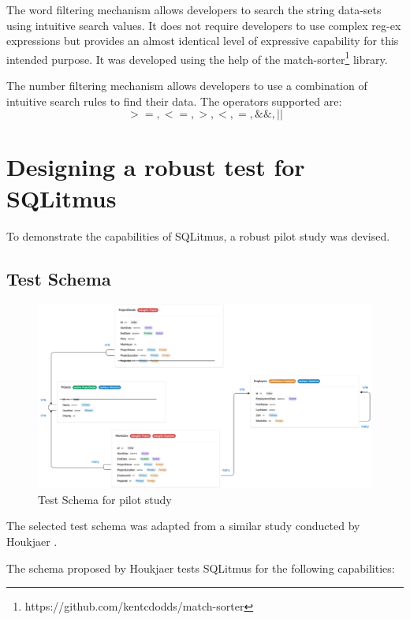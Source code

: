 \documentclass[12pt]{article}
\begin{document}
\begin{spacing}{1.9}
	The word filtering mechanism allows developers to search the string data-sets using intuitive search values. It does not require developers to use complex reg-ex expressions but provides an almost identical level of expressive capability for this intended purpose. It was developed using the help of the match-sorter\footnote{https://github.com/kentcdodds/match-sorter} library.
	
	The number filtering mechanism allows developers to use a combination of intuitive search rules to find their data. The operators supported are:
	\[>=, <=, >, <, =, \&\&, ||\]
	
	\pagebreak
	\section{ Designing a robust test for SQLitmus }
	
	To demonstrate the capabilities of SQLitmus, a robust pilot study was devised.
	
	\subsection{ Test Schema}
	
	\begin{figure}[H]
		\centering
		\includegraphics[width=\textwidth]{4-1.png}
		\caption{Test Schema for pilot study }
		
	\end{figure}
	
	The selected test schema was adapted from a similar study conducted by Houkjaer \cite{Houkjaer:2006}.
	
	The schema proposed by Houkjaer tests SQLitmus for the following capabilities:
	
	\begin{itemize}
		

\end{itemize}
\end{spacing}
\end{document}
